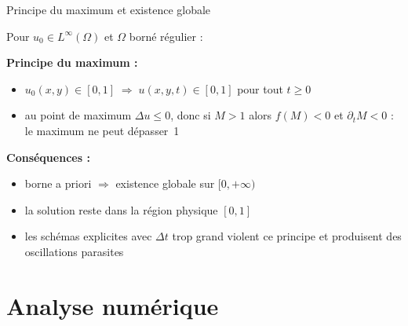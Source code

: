 \documentclass[10pt]{beamer}
\newcommand{\framewithtitle}[1]{%
\begin{frame}[c]{}
  \begin{center}
  \Huge
    \begin{tcolorbox}
      \emph{
        \espace
        \begin{center}
          \textcolor{black}{#1}
        \end{center}
        \espace
      }
    \end{tcolorbox}
  \end{center}
\end{frame}
}
\begin{document}
\begin{frame}{Principe du maximum et existence globale}

Pour $u_0 \in L^\infty(\Omega)$ et $\Omega$ borné régulier :

\bigskip

\textbf{Principe du maximum :}

\begin{itemize}
  \item $u_0(x,y) \in [0,1] \;\Rightarrow\; u(x,y,t) \in [0,1]$ pour tout $t \geq 0$
  \item au point de maximum $\Delta u \leq 0$, donc si $M > 1$ alors $f(M) < 0$
        et $\partial_t M < 0$ : le maximum ne peut dépasser~1
\end{itemize}

\bigskip

\textbf{Conséquences :}

\begin{itemize}
  \item borne a priori $\Rightarrow$ existence globale sur $[0, +\infty)$
  \item la solution reste dans la région physique $[0,1]$
  \item les schémas explicites avec $\Delta t$ trop grand violent ce principe
        et produisent des oscillations parasites
\end{itemize}

\end{frame}

\section{Analyse numérique}
\framewithtitle{Analyse numérique}
\end{document}
